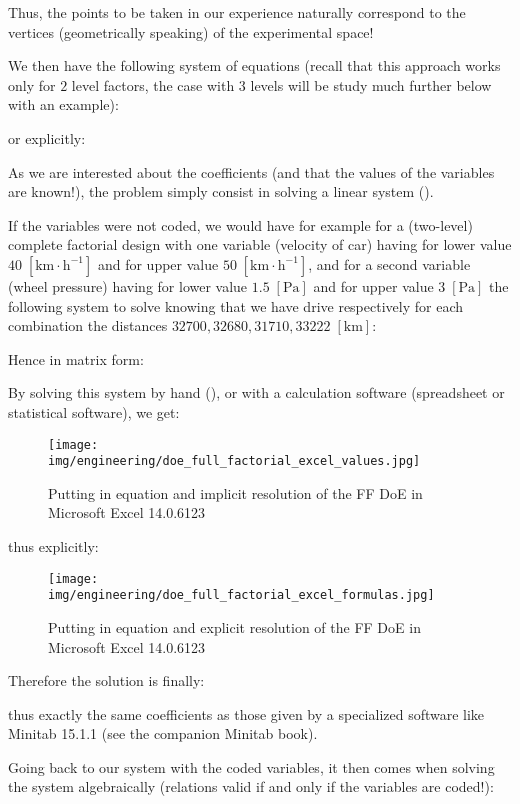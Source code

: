 	Thus, the points to be taken in our experience naturally correspond to the vertices (geometrically speaking) of the experimental space!
	
	We then have the following system of equations (recall that this approach works only for $2$ level factors, the case with $3$ levels will be study much further below with an example):
	
	or explicitly:
	
	As we are interested about the coefficients (and that the values of the variables are known!), the problem simply consist in solving a linear system ().
	
	If the variables were not coded, we would have for example for a (two-level) complete factorial design with one variable (velocity of car) having for lower value $40 \;[\text{km}\cdot\text{h}^{-1}]$ and for upper value  $50 \;[\text{km}\cdot\text{h}^{-1}]$, and for a second variable (wheel pressure) having for lower value $1.5\;[\text{Pa}]$ and for upper value $3\;[\text{Pa}]$ the following system to solve knowing that we have drive respectively for each combination the distances $32700, 32680, 31710, 33222\;[\text{km}]$:
	
	Hence in matrix form:
	
	By solving this system by hand (), or with a calculation software (spreadsheet or statistical software), we get:
	\begin{figure}[H]
		\begin{center}
		\texttt{[image: img/engineering/doe\_full\_factorial\_excel\_values.jpg]}
		\end{center}	
		\caption[]{Putting in equation and implicit resolution of the FF DoE in Microsoft Excel 14.0.6123}
	\end{figure}
	thus explicitly:
	\begin{figure}[H]
		\begin{center}
		\texttt{[image: img/engineering/doe\_full\_factorial\_excel\_formulas.jpg]}
		\end{center}	
		\caption[]{Putting in equation and explicit resolution of the FF DoE in Microsoft Excel 14.0.6123}
	\end{figure}
	Therefore the solution is finally:
	
	thus exactly the same coefficients as those given by a specialized software like Minitab 15.1.1 (see the companion Minitab book).
	
	Going back to our system with the coded variables, it then comes when solving the system algebraically (relations valid if and only if the variables are coded!):
	
